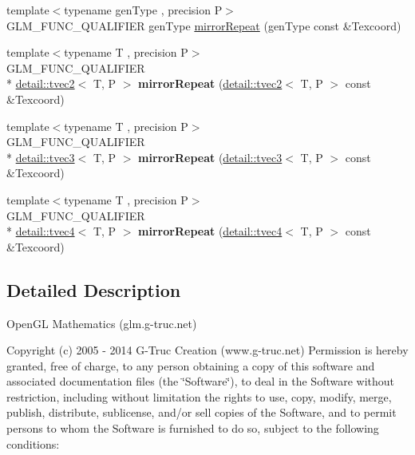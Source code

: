 \begin{DoxyCompactItemize}
\item 
{\footnotesize template$<$typename gen\-Type , precision P$>$ }\\G\-L\-M\-\_\-\-F\-U\-N\-C\-\_\-\-Q\-U\-A\-L\-I\-F\-I\-E\-R gen\-Type \hyperlink{group__gtx__wrap_ga16a89b0661b60d5bea85137bbae74d73}{mirror\-Repeat} (gen\-Type const \&Texcoord)
\item 
\hypertarget{namespaceglm_a49e9d8b92c2dd5f6e6a3069b3262c1bb}{{\footnotesize template$<$typename T , precision P$>$ }\\G\-L\-M\-\_\-\-F\-U\-N\-C\-\_\-\-Q\-U\-A\-L\-I\-F\-I\-E\-R \\*
\hyperlink{structglm_1_1detail_1_1tvec2}{detail\-::tvec2}$<$ T, P $>$ {\bfseries mirror\-Repeat} (\hyperlink{structglm_1_1detail_1_1tvec2}{detail\-::tvec2}$<$ T, P $>$ const \&Texcoord)}\label{namespaceglm_a49e9d8b92c2dd5f6e6a3069b3262c1bb}

\item 
\hypertarget{namespaceglm_aa586893a109d75e6f0421841832548aa}{{\footnotesize template$<$typename T , precision P$>$ }\\G\-L\-M\-\_\-\-F\-U\-N\-C\-\_\-\-Q\-U\-A\-L\-I\-F\-I\-E\-R \\*
\hyperlink{structglm_1_1detail_1_1tvec3}{detail\-::tvec3}$<$ T, P $>$ {\bfseries mirror\-Repeat} (\hyperlink{structglm_1_1detail_1_1tvec3}{detail\-::tvec3}$<$ T, P $>$ const \&Texcoord)}\label{namespaceglm_aa586893a109d75e6f0421841832548aa}

\item 
\hypertarget{namespaceglm_afcb197155bb9ff8d767cd57b540836b1}{{\footnotesize template$<$typename T , precision P$>$ }\\G\-L\-M\-\_\-\-F\-U\-N\-C\-\_\-\-Q\-U\-A\-L\-I\-F\-I\-E\-R \\*
\hyperlink{structglm_1_1detail_1_1tvec4}{detail\-::tvec4}$<$ T, P $>$ {\bfseries mirror\-Repeat} (\hyperlink{structglm_1_1detail_1_1tvec4}{detail\-::tvec4}$<$ T, P $>$ const \&Texcoord)}\label{namespaceglm_afcb197155bb9ff8d767cd57b540836b1}

\end{DoxyCompactItemize}


\subsection{Detailed Description}
Open\-G\-L Mathematics (glm.\-g-\/truc.\-net)

Copyright (c) 2005 -\/ 2014 G-\/\-Truc Creation (www.\-g-\/truc.\-net) Permission is hereby granted, free of charge, to any person obtaining a copy of this software and associated documentation files (the \char`\"{}\-Software\char`\"{}), to deal in the Software without restriction, including without limitation the rights to use, copy, modify, merge, publish, distribute, sublicense, and/or sell copies of the Software, and to permit persons to whom the Software is furnished to do so, subject to the following conditions\-:

